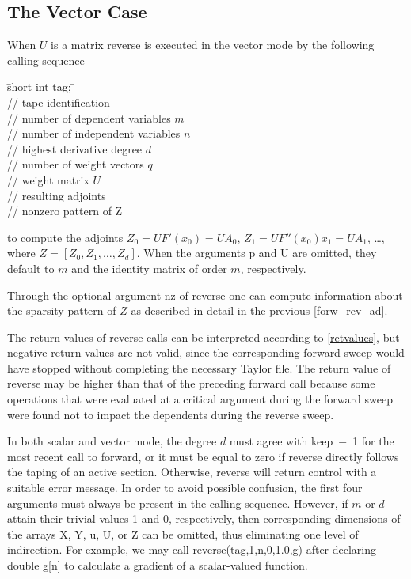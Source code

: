 \documentclass[11pt,twoside]{article}
\begin{document}
\subsection{The Vector Case}
%
\label{vecCas}
%
When $U$ is a matrix {\sf reverse} is executed in the vector mode by the following calling sequence
%
\begin{tabbing}
\hspace{0.5in}\={\sf short int tag;} \hspace{1.1in}\= \kill    %
\\
         \> // tape identification \\
                 \> // number of dependent variables $m$\\
                 \> // number of independent variables $n$\\
                \> // highest derivative degree $d$\\ 
                 \> // number of weight vectors $q$\\
        \> // weight matrix $U$\\
   \> // resulting adjoints \\
        \> // nonzero pattern of {\sf Z}
\end{tabbing}
%
to compute the adjoints $Z_0=U F'(x_0)=U A_0$, $Z_1=U F''(x_0)x_1=U A_1$, 
\ldots, where $Z=[Z_0,Z_1,\ldots,Z_d]$.
When the arguments {\sf p} and {\sf U} are omitted, they default to 
$m$ and the identity matrix of order $m$, respectively.  

Through the optional argument {\sf nz} of {\sf reverse} one can compute
information about the sparsity pattern of $Z$ as described in detail
in the previous \autoref{forw_rev_ad}.

The return values of {\sf reverse} calls can be interpreted according
to \autoref{retvalues}, but negative return values are not
valid, since the corresponding forward sweep would have
stopped without completing the necessary Taylor file. 
The return value of {\sf reverse} may be higher 
than that of the preceding {\sf forward} call because some operations 
that were evaluated  at a critical argument during the forward sweep
were found not to impact the dependents during the reverse sweep.

In both scalar and vector mode, the degree $d$ must agree with
{\sf keep}~$-$~1 for the most recent call to {\sf forward}, or it must be
equal to zero if {\sf reverse} directly follows the taping of an active
section. Otherwise, {\sf reverse} will return control with a suitable error
message. 
In order to avoid possible confusion, the first four arguments must always be
present in the calling sequence. However, if $m$ or $d$
attain their trivial values 1 and 0, respectively, then
corresponding dimensions of the arrays {\sf X}, {\sf Y}, {\sf u},
{\sf U}, or {\sf Z} can be omitted, thus eliminating one level of
indirection.  For example, we may call
{\sf reverse(tag,1,n,0,1.0,g)} after declaring
{\sf double g[n]} 
to calculate a gradient of a scalar-valued function.
\end{document}
